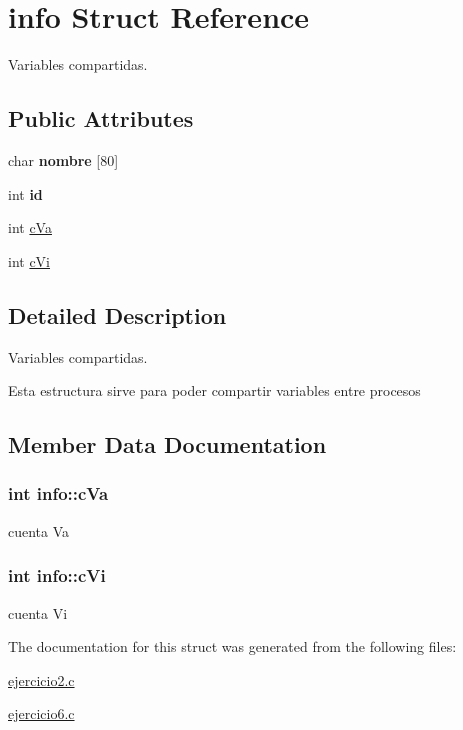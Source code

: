 \hypertarget{structinfo}{\section{info Struct Reference}
\label{structinfo}
}


Variables compartidas.  


\subsection*{Public Attributes}
\begin{DoxyCompactItemize}
\item 
\hypertarget{structinfo_aaa02777b492865c2877852cb159803b1}{char {\bfseries nombre} \mbox{[}80\mbox{]}}\label{structinfo_aaa02777b492865c2877852cb159803b1}

\item 
\hypertarget{structinfo_afe86f23d8bd5fd8d139e39a5b1a01171}{int {\bfseries id}}\label{structinfo_afe86f23d8bd5fd8d139e39a5b1a01171}

\item 
int \hyperlink{structinfo_abf4c654e057e50646e8a3cd5ecf67a76}{c\+Va}
\item 
int \hyperlink{structinfo_a95e1221a8023ea0ec9b94d0795a6f139}{c\+Vi}
\end{DoxyCompactItemize}


\subsection{Detailed Description}
Variables compartidas. 

Esta estructura sirve para poder compartir variables entre procesos 

\subsection{Member Data Documentation}
\hypertarget{structinfo_abf4c654e057e50646e8a3cd5ecf67a76}{
\subsubsection[{c\+Va}]{\setlength{\rightskip}{0pt plus 5cm}int info\+::c\+Va}}\label{structinfo_abf4c654e057e50646e8a3cd5ecf67a76}
cuenta Va \hypertarget{structinfo_a95e1221a8023ea0ec9b94d0795a6f139}{
\subsubsection[{c\+Vi}]{\setlength{\rightskip}{0pt plus 5cm}int info\+::c\+Vi}}\label{structinfo_a95e1221a8023ea0ec9b94d0795a6f139}
cuenta Vi 

The documentation for this struct was generated from the following files\+:\begin{DoxyCompactItemize}
\item 
\hyperlink{ejercicio2_8c}{ejercicio2.\+c}\item 
\hyperlink{ejercicio6_8c}{ejercicio6.\+c}\end{DoxyCompactItemize}
